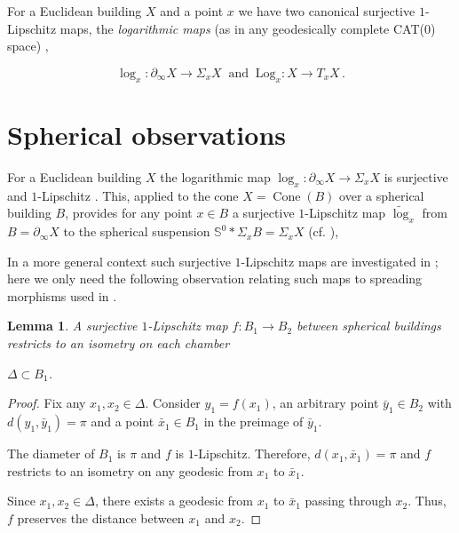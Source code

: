 \documentclass[12pt,leqno]{amsart}
\numberwithin{equation}{section}
\newtheorem{lem}[thm]{Lemma}
\theoremstyle{definition}
\theoremstyle{remark}
\begin{document}
For a Euclidean building $X$ and a point $x$ we have two canonical surjective $1$-Lipschitz maps, the \emph{logarithmic maps}  (as in any geodesically complete CAT(0) space)
 \cite[p. 124-128]{KleinerLeeb1},
 
 
$$\log_x:\partial _{\infty} X \to \Sigma _xX    \; \;  \text{and} \; \; \text{Log} _x :X\to T_xX\,.$$





 


\section{Spherical observations} \label{sec: sph}
For a Euclidean building $X$ the logarithmic map $\log_x :\partial _{\infty} X \to \Sigma _x X$ is surjective and $1$-Lipschitz  \cite[p. 128]{KleinerLeeb1}.
This, applied to the cone $X=\operatorname{Cone}(B)$ over a spherical building $B$, provides for any point $x\in B$ a surjective $1$-Lipschitz map $\tilde {\log} _ x$  from $B=\partial_{\infty} X$ to the spherical suspension  $\mathbb S^0 *\Sigma _xB =\Sigma _xX$ (cf. \cite[Section 2.6]{Lbuild}),

In a more general context such surjective $1$-Lipschitz maps are investigated 
in \cite{Lbuild}; here we only need the following observation relating such maps to  spreading morphisms
used in \cite{KleinerLeeb1}. 






\begin{lem} \label{lem: slm}
A surjective $1$-Lipschitz map $f:B_1\to B_2$ between spherical buildings 
restricts to an isometry on each chamber

$\Delta \subset B_1$.   

\end{lem}

\begin{proof}
Fix any $x_1,x_2\in \Delta$.  Consider $y_1=f(x_1)$, an arbitrary point $\bar y_1\in B_2$ with $d(y_1,\bar y_1)=\pi$ 
and a point $\bar x_1 \in B_1$ in the preimage of $\bar y_1$.  

The diameter of $B_1$ is $\pi$ and  $f$ is $1$-Lipschitz. Therefore,
$d(x_1,\bar x_1)=\pi$ and $f$ restricts to an isometry on any geodesic from $x_1$ to $\bar x_1$.  


Since $x_1,x_2 \in \Delta$, there exists a geodesic from $x_1$ to $\bar x_1$ passing through $x_2$.  Thus, $f$ preserves the distance between $x_1$ and $x_2$.
\end{proof}
\end{document}
